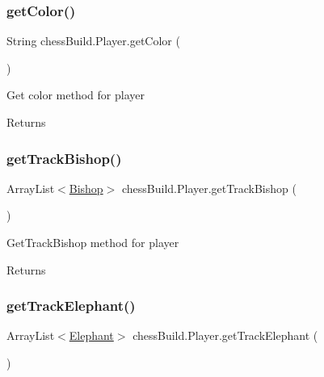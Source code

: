 \subsubsection{\texorpdfstring{get\+Color()}{getColor()}}
{\footnotesize\ttfamily String chess\+Build.\+Player.\+get\+Color (\begin{DoxyParamCaption}{ }\end{DoxyParamCaption})}

Get color method for player \begin{DoxyReturn}{Returns}

\end{DoxyReturn}
\mbox{\label{classchess_build_1_1_player_a381227f722157384cbd9fa1730374e09}} 
\subsubsection{\texorpdfstring{get\+Track\+Bishop()}{getTrackBishop()}}
{\footnotesize\ttfamily Array\+List$<$\hyperlink{classchess_build_1_1_bishop}{Bishop}$>$ chess\+Build.\+Player.\+get\+Track\+Bishop (\begin{DoxyParamCaption}{ }\end{DoxyParamCaption})}

Get\+Track\+Bishop method for player \begin{DoxyReturn}{Returns}

\end{DoxyReturn}
\mbox{\label{classchess_build_1_1_player_ad45b47c46c9940e067b7d23f765ed2ce}} 
\subsubsection{\texorpdfstring{get\+Track\+Elephant()}{getTrackElephant()}}
{\footnotesize\ttfamily Array\+List$<$\hyperlink{classchess_build_1_1_elephant}{Elephant}$>$ chess\+Build.\+Player.\+get\+Track\+Elephant (\begin{DoxyParamCaption}{ }\end{DoxyParamCaption})}

